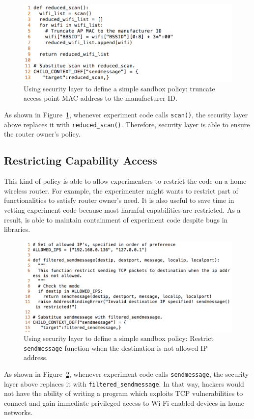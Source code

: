 \begin{figure}%
\centering
\includegraphics[width=0.8\columnwidth]{figure/example.png}
\caption{Using security layer to define a simple sandbox policy: truncate access point MAC address to the manufacturer ID.}
\label{fig-examplecode1}
\end{figure}

As shown in Figure~\ref{fig-examplecode1}, whenever experiment code calls \texttt{scan()}, the security layer above replaces it with \texttt{reduced\_scan()}. Therefore, security layer is able to ensure the router owner's policy.

\subsection{Restricting Capability Access}
This kind of policy is able to allow experimenters to restrict the code on a home wireless router. For example, the experimenter might wants to restrict part of functionalities to satisfy router owner's need. It is also useful to save time in vetting experiment code because most harmful capabilities are restricted. As a result, \sysname is able to maintain containment of experiment code despite bugs in libraries.

\begin{figure}%
\centering
\includegraphics[width=0.8\columnwidth]{figure/example-restrict_data.png}
\caption{Using security layer to define a simple sandbox policy: Restrict \texttt{sendmessage} function when the destination is not allowed IP address.}
\label{fig-examplecode2}
\end{figure}

As shown in Figure~\ref{fig-examplecode2}, whenever experiment code calls \texttt{sendmessage}, the security layer above replaces it with \texttt{filtered\_sendmessage}. In that way, hackers would not have the ability of writing a program which exploits TCP vulnerabilities to connect and gain immediate privileged access to Wi-Fi enabled devices in home networks. 

 